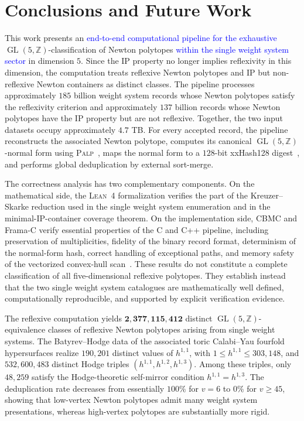 \documentclass[appliedmath,article,submit,moreauthors]{Definitions/mdpi}
\newcommand{\Z}{\mathbb{Z}}
\newcommand{\GL}{\operatorname{GL}}
\newcommand{\Lean}{\textsc{Lean}}
\newcommand{\PALP}{\textsc{Palp}}
\begin{document}
\section{Conclusions and Future Work}
\label{sec:conclusion}

This work presents an \textcolor{blue}{end-to-end computational pipeline for
the exhaustive} \(\GL(5,\Z)\)-classification of Newton polytopes
\textcolor{blue}{within the single weight system sector} in dimension \(5\).
Since the IP property no longer implies reflexivity
in this dimension, the computation treats reflexive Newton polytopes and IP but
non-reflexive Newton containers as distinct classes. The pipeline processes
approximately \(185\) billion weight system records whose Newton polytopes
satisfy the reflexivity criterion and approximately \(137\) billion records
whose Newton polytopes have the IP property but are not reflexive. Together, the
two input datasets occupy approximately \(4.7\) TB. For every accepted record,
the pipeline reconstructs the associated Newton polytope, computes its canonical
\(\GL(5,\Z)\)-normal form using \PALP~\cite{PALP}, maps the normal form to a
\(128\)-bit xxHash128 digest~\cite{xxHash}, and performs global deduplication by
external sort-merge.

The correctness analysis has two complementary components. On the mathematical
side, the \Lean~4 formalization verifies the part of the Kreuzer--Skarke
reduction used in the single weight system enumeration and in the
minimal-IP-container coverage theorem. On the implementation side, CBMC and
Frama-C verify essential properties of the C and C++ pipeline, including
preservation of multiplicities, fidelity of the binary record format,
determinism of the normal-form hash, correct handling of exceptional paths, and
memory safety of the vectorized convex-hull scan~\cite{LeanMathlib,CBMC,FramaC}.
These results do not constitute a complete classification of all
five-dimensional reflexive polytopes. They establish instead that the two
single weight system catalogues are mathematically well defined, computationally
reproducible, and supported by explicit verification evidence.

The reflexive computation yields \(\mathbf{2{,}377{,}115{,}412}\) distinct
\(\GL(5,\Z)\)-equivalence classes of reflexive Newton polytopes arising from
single weight systems. The Batyrev--Hodge data of the associated toric
Calabi--Yau fourfold hypersurfaces realize \(190{,}201\) distinct values of
\(h^{1,1}\), with \(1\leq h^{1,1}\leq303{,}148\), and \(532{,}600{,}483\)
distinct Hodge triples \((h^{1,1},h^{1,2},h^{1,3})\). Among these triples, only
\(48{,}259\) satisfy the Hodge-theoretic self-mirror condition
\(h^{1,1}=h^{1,3}\). The deduplication rate decreases from essentially \(100\%\)
for \(v=6\) to \(0\%\) for \(v\geq45\), showing that low-vertex Newton polytopes
admit many weight system presentations, whereas high-vertex polytopes are
substantially more rigid.
\end{document}
